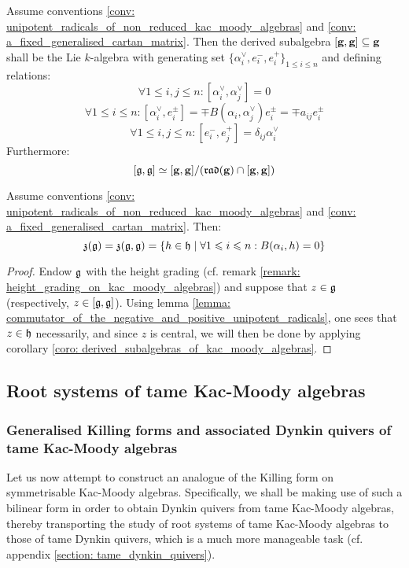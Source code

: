             \begin{corollary} \label{coro: derived_subalgebras_of_kac_moody_algebras}
                Assume conventions \ref{conv: unipotent_radicals_of_non_reduced_kac_moody_algebras} and \ref{conv: a_fixed_generalised_cartan_matrix}. Then the derived subalgebra $[\mathbf{g}, \mathbf{g}] \subseteq \mathbf{g}$ shall be the Lie $k$-algebra with generating set $\{\alpha_i^{\vee}, e_i^-, e_i^+\}_{1 \leq i \leq n}$ and defining relations:
                    $$\forall 1 \leq i, j \leq n: [\alpha_i^{\vee}, \alpha_j^{\vee}] = 0$$
                    $$\forall 1 \leq i \leq n: [\alpha_i^{\vee}, e_i^{\pm}] = \mp B(\alpha_i, \alpha_j^{\vee}) e_i^{\pm} = \mp a_{ij} e_i^{\pm}$$
                    $$\forall 1 \leq i, j \leq n: [e_i^-, e_j^+] = \delta_{ij} \alpha_i^{\vee}$$
                Furthermore:
                    $$[\mathfrak{g}, \mathfrak{g}] \simeq [\mathbf{g}, \mathbf{g}]/( \mathfrak{rad}(\mathbf{g}) \cap [\mathbf{g}, \mathbf{g}] )$$
            \end{corollary}
            \begin{proposition} \label{prop: centres_of_reduced_kac_moody_algebras}
                \cite[Proposition 1.6]{kac_infinite_dimensional_lie_algebras} Assume conventions \ref{conv: unipotent_radicals_of_non_reduced_kac_moody_algebras} and \ref{conv: a_fixed_generalised_cartan_matrix}. Then:
                    $$\mathfrak{z}(\mathfrak{g}) = \mathfrak{z}(\mathfrak{g}, \mathfrak{g}) = \{h \in \mathfrak{h} \mid \forall 1 \leqslant i \leqslant n: B(\alpha_i, h) = 0\}$$
            \end{proposition}
                \begin{proof}
                    Endow $\mathfrak{g}$ with the height grading (cf. remark \ref{remark: height_grading_on_kac_moody_algebras}) and suppose that $z \in \mathfrak{g}$ (respectively, $z \in [\mathfrak{g}, \mathfrak{g}]$). Using lemma \ref{lemma: commutator_of_the_negative_and_positive_unipotent_radicals}, one sees that $z \in \mathfrak{h}$ necessarily, and since $z$ is central, we will then be done by applying corollary \ref{coro: derived_subalgebras_of_kac_moody_algebras}.
                \end{proof}
    
    \subsection{Root systems of tame Kac-Moody algebras}
        \subsubsection{Generalised Killing forms and associated Dynkin quivers of tame Kac-Moody algebras}
            Let us now attempt to construct an analogue of the Killing form on symmetrisable Kac-Moody algebras. Specifically, we shall be making use of such a bilinear form in order to obtain Dynkin quivers from tame Kac-Moody algebras, thereby transporting the study of root systems of tame Kac-Moody algebras to those of tame Dynkin quivers, which is a much more manageable task (cf. appendix \ref{section: tame_dynkin_quivers}).
        
